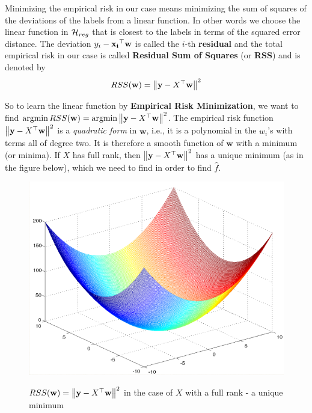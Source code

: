 Minimizing the empirical risk in our case means minimizing the sum of squares of the deviations of the labels from a linear function. In other words we choose the linear function in $\mathcal{H}_{reg}$ that is closest to the labels in terms of the squared error distance. The deviation $y_i-\mathbf{x_i}^{\top} \mathbf{w}$ is called the $i$-th \textbf{residual} and the total empirical risk in our case is called \textbf{Residual Sum of Squares} (or \textbf{RSS}) and is denoted by
   \[
   RSS(\mathbf{w}) = \left\| \mathbf{y}-X^{\top}\mathbf{w}\right\|^2
   \]

\vspace{5mm}

So to learn the linear function by \textbf{Empirical Risk Minimization}, we want to find $\text{argmin} \, RSS(\mathbf{w})=\text{argmin} \left\| \mathbf{y}-X^{\top}\mathbf{w}\right\|^2$. The empirical risk function $\left\| \mathbf{y}-X^{\top}\mathbf{w}\right\|^2$ is a \textit{quadratic form} in $\mathbf{w}$, i.e., it is a polynomial in the $w_i$'s with terms all of degree two. It is therefore a smooth function of $\mathbf{w}$ with a minimum (or minima). If $X$ has full rank, then $\left\| \mathbf{y}-X^{\top}\mathbf{w}\right\|^2$ has a unique minimum (as in the figure below), which we need to find in order to find $\hat{f}$.

\begin{figure}[h!]
  \centering
    \includegraphics[width=4.5in]{parabola.png} \\
 \caption{$RSS(\mathbf{w})=\left\| \mathbf{y}-X^{\top}\mathbf{w}\right\|^2$ in the case of $X$ with a full rank - a unique minimum}
\end{figure}

\vspace{5mm}

